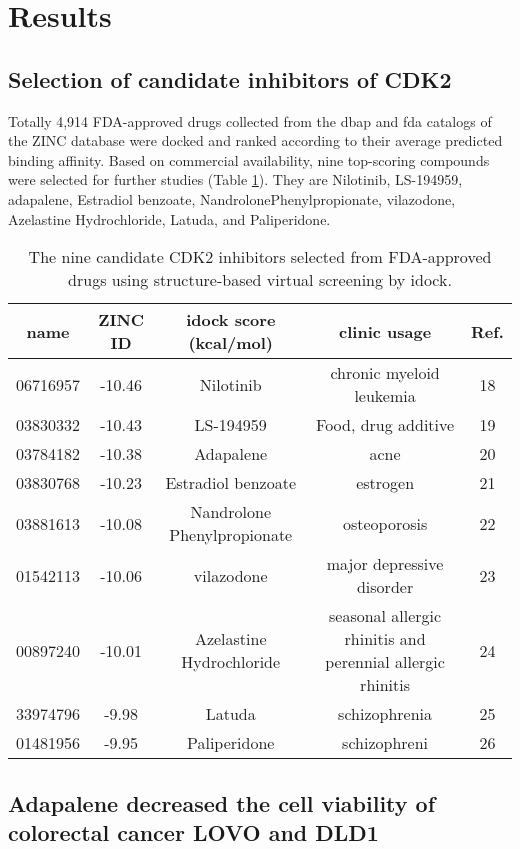 \section{Results}

\subsection{Selection of candidate inhibitors of CDK2}

Totally 4,914 FDA-approved drugs collected from the dbap and fda catalogs of the ZINC database were docked and ranked according to their average predicted binding affinity. Based on commercial availability, nine top-scoring compounds were selected for further studies (Table \ref{cdk2:Top9}). They are Nilotinib, LS-194959, adapalene, Estradiol benzoate, NandrolonePhenylpropionate, vilazodone, Azelastine Hydrochloride, Latuda, and Paliperidone.

\begin{table}
\caption{The nine candidate CDK2 inhibitors selected from FDA-approved drugs using structure-based virtual screening by idock.}
\label{cdk2:Top9}
\begin{tabular}{ccccc}
\hline
name & ZINC ID & idock score (kcal/mol) & clinic usage & Ref.\\
\hline
06716957 & -10.46 & Nilotinib & chronic myeloid leukemia & 18\\
03830332 & -10.43 & LS-194959 & Food, drug additive & 19\\
03784182 & -10.38 & Adapalene & acne & 20\\
03830768 & -10.23 & Estradiol benzoate & estrogen & 21\\
03881613 & -10.08 & Nandrolone Phenylpropionate & osteoporosis & 22\\
01542113 & -10.06 & vilazodone & major depressive disorder & 23\\
00897240 & -10.01 & Azelastine Hydrochloride & seasonal allergic rhinitis and perennial allergic rhinitis & 24\\
33974796 &  -9.98 & Latuda & schizophrenia & 25\\
01481956 &  -9.95 & Paliperidone & schizophreni & 26\\
\hline
\end{tabular}
\end{table}

\subsection{Adapalene decreased the cell viability of colorectal cancer LOVO and DLD1}


